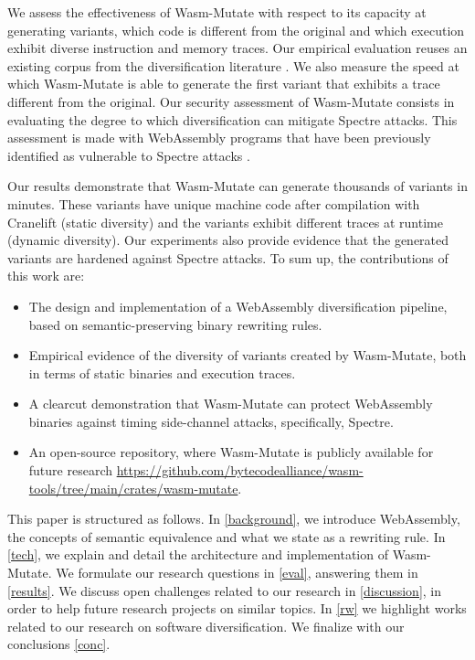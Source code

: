 \documentclass[a4paper,fleqn]{cas-dc}
\newcommand*\badge[1]{ \colorbox{red}{\color{white}#1}}
\newcommand{\tool}{{\sc Wasm-Mutate}\xspace}
\newcommand{\Wasm}{WebAssembly\xspace}
\newcommand{\wasm}{\Wasm}
\newcommand{\repourl}{\url{https://github.com/bytecodealliance/wasm-tools/tree/main/crates/wasm-mutate}}
\newcommand{\todo}[1]{%
\refstepcounter{todo}
\noindent\textbf{\badge{TODO}} {\color{red}#1}
\addcontentsline{td}{todo}
{\color{red}\thesection.\thetodo\xspace #1}}
\begin{document}


We assess the effectiveness of \tool with respect to its capacity at generating variants, which code is different from the original and which execution exhibit diverse instruction and memory traces.
Our empirical evaluation reuses an existing corpus from the diversification literature \cite{arteaga2020crow}.
We also measure the speed at which \tool is able to generate the first variant that exhibits a trace different from the original.
Our security assessment of  \tool consists in evaluating the degree to which diversification can mitigate Spectre attacks. This assessment is made with \wasm programs that have been previously identified as vulnerable to Spectre attacks \cite{Swivel}.


Our results demonstrate that \tool can generate thousands of variants in minutes. These variants have unique machine code after compilation with Cranelift (static diversity) and the variants exhibit different traces at runtime (dynamic diversity).
Our experiments also provide evidence that the generated variants are hardened against Spectre attacks.
To sum up, the contributions of this work are:

\begin{itemize}
    \item The design and implementation of a \Wasm diversification pipeline, based on semantic-preserving binary rewriting rules.
    \item Empirical evidence of the diversity of variants created by \tool, both in terms of static binaries and execution traces.
    \item A clearcut demonstration that \tool can protect \wasm binaries against timing side-channel attacks, specifically, Spectre.
    \item An open-source repository, where \tool is publicly available for future research \repourl.    
\end{itemize}

This paper is structured as follows. 
In \autoref{background}, we introduce WebAssembly, the concepts of semantic equivalence and what we state as a rewriting rule.
In \autoref{tech}, we explain and detail the architecture and implementation of \tool.
We formulate our research questions in \autoref{eval}, answering them in \autoref{results}.
We discuss open challenges related to our research in \autoref{discussion}, in order to help future research projects on similar topics.
In \autoref{rw} we highlight works related to our research on software diversification.
We finalize with our conclusions \autoref{conc}.
\end{document}
